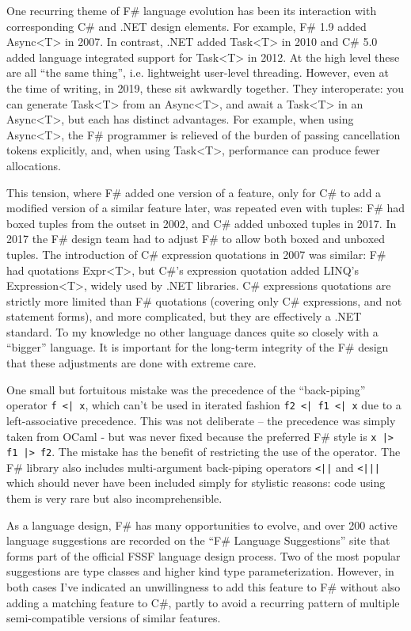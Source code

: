 \documentclass[acmsmall,review]{acmart}\settopmatter{printfolios=true,printccs=false,printacmref=false}
\begin{document}
One recurring theme of F\# language evolution has been its interaction with corresponding C\# and .NET design elements.  For example, F\# 1.9 added Async<T> in 2007.  In contrast, .NET added Task<T> in 2010 and C\# 5.0 added language integrated support for Task<T> in 2012.  At the high level these are all “the same thing”, i.e. lightweight user-level threading. However, even at the time of writing, in 2019, these sit awkwardly together. They interoperate: you can generate Task<T> from an Async<T>, and await a Task<T> in an Async<T>, but each has distinct advantages. For example, when using Async<T>, the F\# programmer is relieved of the burden of passing cancellation tokens explicitly, and, when using Task<T>, performance can produce fewer allocations.  

This tension, where F\# added one version of a feature, only for C\# to add a modified version of a similar feature later, was repeated even with tuples: F\# had boxed tuples from the outset in 2002, and C\# added unboxed tuples in 2017.  In 2017 the F\# design team had to adjust F\# to allow both boxed and unboxed tuples. The introduction of C\# expression quotations in 2007 was similar: F\# had quotations Expr<T>, but C\#’s expression quotation added LINQ’s Expression<T>, widely used by .NET libraries. C\# expressions quotations are strictly more limited than F\# quotations (covering only C\# expressions, and not statement forms), and more complicated, but they are effectively a .NET standard.  To my knowledge no other language dances quite so closely with a “bigger” language. It is important for the long-term integrity of the F\# design that these adjustments are done with extreme care.

One small but fortuitous mistake was the precedence of the “back-piping” operator \verb$f <| x$, which can’t be used in iterated fashion \verb$f2 <| f1 <| x$ due to a left-associative precedence. This was not deliberate – the precedence was simply taken from OCaml - but was never fixed because the preferred F\# style is  \verb$x |> f1 |> f2$. The mistake has the benefit of restricting the use of the operator. The F\# library also includes multi-argument back-piping operators \verb$<||$ and \verb$<|||$ which should never have been included simply for stylistic reasons: code using them is very rare but also incomprehensible.

As a language design, F\# has many opportunities to evolve, and over 200 active language suggestions are recorded on the “F\# Language Suggestions” site that forms part of the official FSSF language design process.  Two of the most popular suggestions are type classes and higher kind type parameterization. However, in both cases I’ve indicated an unwillingness to add this feature to F\# without also adding a matching feature to C\#, partly to avoid a recurring pattern of multiple semi-compatible versions of similar features.
\end{document}
